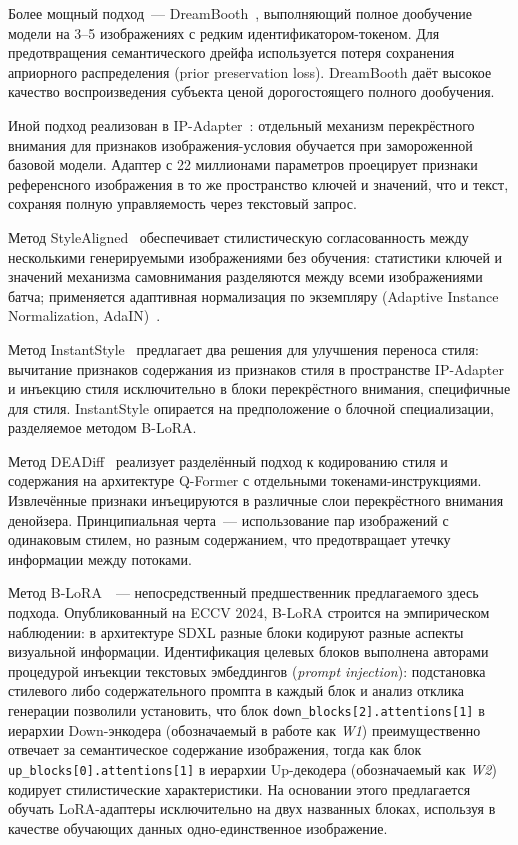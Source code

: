 Более мощный подход~--- DreamBooth~\cite{ruiz2023dreambooth}, выполняющий полное дообучение модели на 3--5 изображениях с редким идентификатором-токеном. Для предотвращения семантического дрейфа используется потеря сохранения априорного распределения (prior preservation loss). DreamBooth даёт высокое качество воспроизведения субъекта ценой дорогостоящего полного дообучения.

Иной подход реализован в IP-Adapter~\cite{ye2023ipadapter}: отдельный механизм перекрёстного внимания для признаков изображения-условия обучается при замороженной базовой модели. Адаптер с 22 миллионами параметров проецирует признаки референсного изображения в то же пространство ключей и значений, что и текст, сохраняя полную управляемость через текстовый запрос.

Метод StyleAligned~\cite{hertz2024stylealigned} обеспечивает стилистическую согласованность между несколькими генерируемыми изображениями без обучения: статистики ключей и значений механизма самовнимания разделяются между всеми изображениями батча; применяется адаптивная нормализация по экземпляру (Adaptive Instance Normalization, AdaIN)~\cite{huang2017adain}.

Метод InstantStyle~\cite{wang2024instantstyle} предлагает два решения для улучшения переноса стиля: вычитание признаков содержания из признаков стиля в пространстве IP-Adapter и инъекцию стиля исключительно в блоки перекрёстного внимания, специфичные для стиля. InstantStyle опирается на предположение о блочной специализации, разделяемое методом B-LoRA.

Метод DEADiff~\cite{qi2024deadiff} реализует разделённый подход к кодированию стиля и содержания на архитектуре Q-Former с отдельными токенами-инструкциями. Извлечённые признаки инъецируются в различные слои перекрёстного внимания денойзера. Принципиальная черта~--- использование пар изображений с одинаковым стилем, но разным содержанием, что предотвращает утечку информации между потоками.

Метод B-LoRA~\cite{frenkel2024blora}~--- непосредственный предшественник предлагаемого здесь подхода. Опубликованный на ECCV 2024, B-LoRA строится на эмпирическом наблюдении: в архитектуре SDXL разные блоки кодируют разные аспекты визуальной информации. Идентификация целевых блоков выполнена авторами процедурой инъекции текстовых эмбеддингов (\textit{prompt injection}): подстановка стилевого либо содержательного промпта в каждый блок и анализ отклика генерации позволили установить, что блок \texttt{down\_blocks[2].attentions[1]} в иерархии Down-энкодера (обозначаемый в работе как \textit{W1}) преимущественно отвечает за семантическое содержание изображения, тогда как блок \texttt{up\_blocks[0].attentions[1]} в иерархии Up-декодера (обозначаемый как \textit{W2}) кодирует стилистические характеристики. На основании этого предлагается обучать LoRA-адаптеры исключительно на двух названных блоках, используя в качестве обучающих данных одно-единственное изображение.


